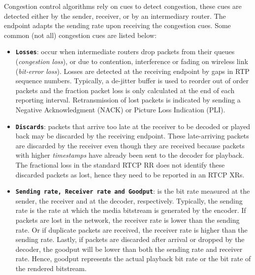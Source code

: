 Congestion control algorithms rely on cues to detect congestion, these cues
are detected either by the sender, receiver, or by an intermediary router. The
endpoint adapts the sending rate upon receiving the congestion cues. Some
common (not all) congestion cues are listed below:

\begin{itemize}
\setlength{\itemsep}{0pt}

\item \textbf{\texttt{Losses}}: occur when intermediate routers drop packets
from their queues (\emph{congestion loss}), or due to contention, interference
or fading on wireless link (\emph {bit-error loss}). Losses are detected at
the receiving endpoint by gaps in RTP sequence numbers. Typically, a de-jitter
buffer is used to reorder out of order packets and the fraction packet loss is
only calculated at the end of each reporting interval. Retransmission of lost
packets is indicated by sending a Negative Acknowledgment (NACK) or Picture
Loss Indication (PLI).

\item \textbf{\texttt{Discards}}: packets that arrive too late at the receiver
to be decoded or played back may be discarded by the receiving endpoint. These
late-arriving packets are discarded by the receiver even though they are
received because packets with higher \textit{timestamps} have already been
sent to the decoder for playback. The fractional loss in the standard RTCP RR
does not identify these discarded packets as lost, hence they need to be
reported in an RTCP XRs.

\item \textbf{\texttt{Sending rate, Receiver rate and Goodput}}: is the bit
rate measured at the sender, the receiver and at the decoder, respectively.
Typically, the sending rate is the rate at which the media bitstream is
generated by the encoder. If packets are lost in the network, the receiver
rate is lower than the sending rate. Or if duplicate packets are received, the
receiver rate is higher than the sending rate. Lastly, if packets are
discarded after arrival or dropped by the decoder, the goodput will be lower
than both the sending rate and receiver rate. Hence, goodput represents the
actual playback bit rate or the bit rate of the rendered bitstream.


\end{itemize}
